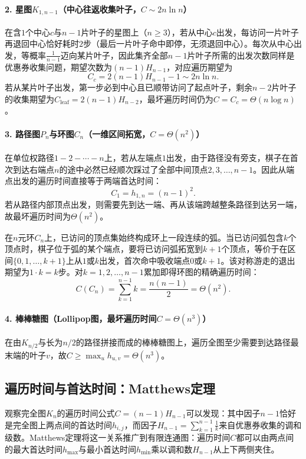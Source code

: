 \paragraph{2. 星图$K_{1,n-1}$（中心往返收集叶子，$C\sim 2n\ln n$）}

在含$1$个中心$c$与$n-1$片叶子的星图上（$n\geq3$），若从中心$c$出发，每访问一片叶子再退回中心恰好耗时$2$步（最后一片叶子命中即停，无须退回中心）。每次从中心出发，等概率$\frac{1}{n-1}$迈向某片叶子，因此集齐全部$n-1$片叶子所需的出发次数同样是优惠券收集问题，期望次数为$(n-1)H_{n-1}$，对应遍历期望为
\[
  C_c = 2(n-1)H_{n-1} - 1 \sim 2n\ln n.
\]
若从某片叶子出发，第一步必到中心且已顺带访问了起点叶子，剩余$n-2$片叶子的收集期望为$C_{\mathrm{leaf}}=2(n-1)H_{n-2}$，最坏遍历时间仍为$C=C_c=\Theta(n\log n)$。

\paragraph{3. 路径图$P_n$与环图$C_n$（一维区间拓宽，$C=\Theta(n^2)$）}

在单位权路径$1\!-\!2\!-\!\cdots\!-\!n$上，若从左端点$1$出发，由于路径没有旁支，棋子在首次到达右端点$n$的途中必然已经顺次踩过了全部中间顶点$2,3,\ldots,n-1$。因此从端点出发的遍历时间直接等于两端首达时间：
\[
  C_1 = h_{1,n} = (n-1)^2.
\]
若从路径内部顶点出发，则需要先到达一端、再从该端跨越整条路径到达另一端，故最坏遍历时间为$\Theta(n^2)$。

在$n$元环$C_n$上，已访问的顶点集始终构成环上一段连续的弧。当已访问弧包含$k$个顶点时，棋子位于弧的某个端点，要将已访问弧拓宽到$k+1$个顶点，等价于在区间$\{0,1,\ldots,k+1\}$上从$1$或$k$出发，首次命中吸收端点$0$或$k+1$。该对称游走的退出期望为$1\cdot k=k$步。对$k=1,2,\ldots,n-1$累加即得环图的精确遍历时间：
\[
  C(C_n) = \sum_{k=1}^{n-1} k = \frac{n(n-1)}{2} = \Theta(n^2).
\]

\paragraph{4. 棒棒糖图（Lollipop图，最坏遍历时间$C=\Theta(n^3)$）}

在由$K_{n/2}$与长为$n/2$的路径拼接而成的棒棒糖图上，遍历全图至少需要到达路径最末端的叶子$v$，故$C\geq\max_{u}h_{u,v}=\Theta(n^3)$。

\subsection{遍历时间与首达时间：Matthews定理}
\label{sec:graph-walk-matthews}

观察完全图$K_n$的遍历时间公式$C=(n-1)H_{n-1}$可以发现：其中因子$n-1$恰好是完全图上两点间的首达时间$h_{i,j}$，而因子$H_{n-1}=\sum_{k=1}^{n-1}\frac1k$来自优惠券收集的调和级数。Matthews定理将这一关系推广到有限连通图：遍历时间$C$都可以由两点间的最大首达时间$h_{\max}$与最小首达时间$h_{\min}$乘以调和数$H_{n-1}$从上下两侧夹住。


